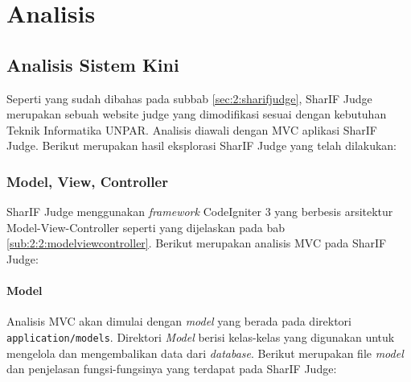 \chapter{Analisis}
\label{chap:analisis}


\section{Analisis Sistem Kini}
\label{sec:3:sistemkini}

Seperti yang sudah dibahas pada subbab \ref{sec:2:sharifjudge}, SharIF Judge merupakan sebuah website judge yang dimodifikasi sesuai dengan kebutuhan Teknik Informatika UNPAR. Analisis diawali dengan MVC aplikasi SharIF Judge. Berikut merupakan hasil eksplorasi SharIF Judge yang telah dilakukan:

\subsection{Model, View, Controller}
\label{sub:3:1:modelviewcontroller}

SharIF Judge menggunakan \textit{framework} CodeIgniter 3 yang berbesis arsitektur Model-View-Controller seperti yang dijelaskan pada bab \ref{sub:2:2:modelviewcontroller}. Berikut merupakan analisis MVC pada SharIF Judge:

\subsubsection{Model}
\label{sub:3:1:1:model}

Analisis MVC akan dimulai dengan \textit{model} yang berada pada direktori \verb|application/models|. Direktori \textit{Model} berisi kelas-kelas yang digunakan untuk mengelola dan mengembalikan data dari \textit{database}. Berikut merupakan file \textit{model} dan penjelasan fungsi-fungsinya yang terdapat pada SharIF Judge:

